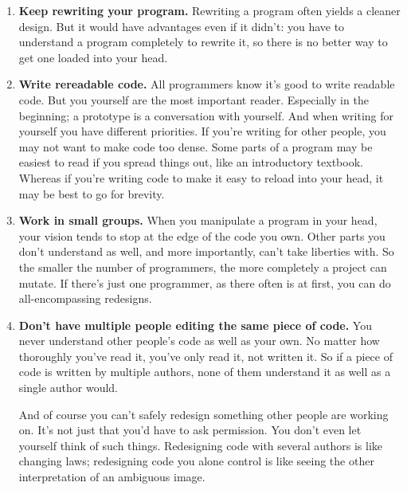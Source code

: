 \begin{enumerate}
  You can magnify the effect of a powerful language by using a style
  called bottom-up programming, where you write programs in multiple
  layers, the lower ones acting as programming languages for those
  above. If you do this right, you only have to keep the topmost layer
  in your head.
\item
  \textbf{Keep rewriting your program.} Rewriting a program often yields
  a cleaner design. But it would have advantages even if it didn't: you
  have to understand a program completely to rewrite it, so there is no
  better way to get one loaded into your head.
\item
  \textbf{Write rereadable code.} All programmers know it's good to
  write readable code. But you yourself are the most important reader.
  Especially in the beginning; a prototype is a conversation with
  yourself. And when writing for yourself you have different priorities.
  If you're writing for other people, you may not want to make code too
  dense. Some parts of a program may be easiest to read if you spread
  things out, like an introductory textbook. Whereas if you're writing
  code to make it easy to reload into your head, it may be best to go
  for brevity.
\item
  \textbf{Work in small groups.} When you manipulate a program in your
  head, your vision tends to stop at the edge of the code you own. Other
  parts you don't understand as well, and more importantly, can't take
  liberties with. So the smaller the number of programmers, the more
  completely a project can mutate. If there's just one programmer, as
  there often is at first, you can do all-encompassing redesigns.
\item
  \textbf{Don't have multiple people editing the same piece of code.}
  You never understand other people's code as well as your own. No
  matter how thoroughly you've read it, you've only read it, not written
  it. So if a piece of code is written by multiple authors, none of them
  understand it as well as a single author would.

  And of course you can't safely redesign something other people are
  working on. It's not just that you'd have to ask permission. You don't
  even let yourself think of such things. Redesigning code with several
  authors is like changing laws; redesigning code you alone control is
  like seeing the other interpretation of an ambiguous image.


\end{enumerate}
